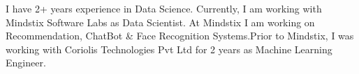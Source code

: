 
\begin{cvparagraph}
I have 2+ years experience in Data Science. Currently, I am working with Mindstix Software Labs as Data Scientist. At Mindstix I am working on Recommendation, ChatBot \& Face Recognition Systems.\newline Prior to Mindstix, I was working with Coriolis Technologies Pvt Ltd for 2 years as Machine Learning Engineer.
\end{cvparagraph}
